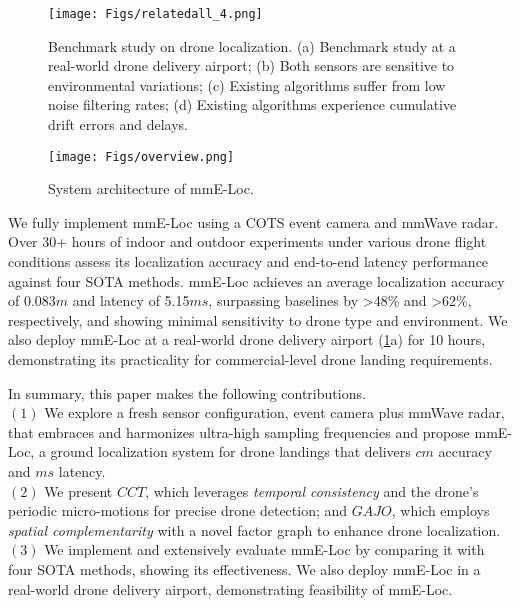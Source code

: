 \begin{figure}[t]
    \setlength{\belowcaptionskip}{-0.3cm}
    \setlength{\subfigcapskip}{-0.25cm}
    \centering
        \texttt{[image: Figs/relatedall\_4.png]}
        \vspace{-0.4cm}
    \caption{
    Benchmark study on drone localization.
    \textnormal{(a) Benchmark study at a real-world drone delivery airport; (b) Both sensors are sensitive to environmental variations; (c) Existing algorithms suffer from low noise filtering rates; (d) Existing algorithms experience cumulative drift errors and delays. }}
    \label{relatedwork}
    \vspace{-0.5cm}
\end{figure} 

\begin{figure*}[t]
    \setlength{\abovecaptionskip}{0.2cm} %
    \setlength{\belowcaptionskip}{-0.5cm}
    \setlength{\subfigcapskip}{-0.25cm}
    \centering
        \texttt{[image: Figs/overview.png]}
        \vspace{-0.1cm}
    \caption{System architecture of mmE-Loc.}
    \label{overview}
\end{figure*} 


We fully implement mmE-Loc using a COTS event camera and mmWave radar. 
Over 30+ hours of indoor and outdoor experiments under various drone flight conditions assess its localization accuracy and end-to-end latency performance against four SOTA methods.
mmE-Loc achieves an average localization accuracy of 0.083$m$ and latency of 5.15$ms$, surpassing baselines by >48\% and >62\%, respectively, and showing minimal sensitivity to drone type and environment.
We also deploy mmE-Loc at a real-world drone delivery airport (\fig \ref{relatedwork}a) for 10 hours, demonstrating its practicality for commercial-level drone landing requirements. 

In summary, this paper makes the following contributions.\\
\noindent $(1)$ We explore a fresh sensor configuration, event camera plus mmWave radar, that embraces and harmonizes ultra-high sampling frequencies and propose mmE-Loc, a ground localization system for drone landings that delivers $cm$ accuracy and $ms$ latency.\\
\noindent $(2)$ We present $CCT$, which leverages \textit{temporal consistency} and the drone's periodic micro-motions for precise drone detection; and $GAJO$, which employs \textit{spatial complementarity} with a novel factor graph to enhance drone localization.\\
\noindent $(3)$ We implement and extensively evaluate mmE-Loc by comparing it with four SOTA methods, showing its effectiveness. We also deploy mmE-Loc in a real-world drone delivery airport, demonstrating feasibility of mmE-Loc.
